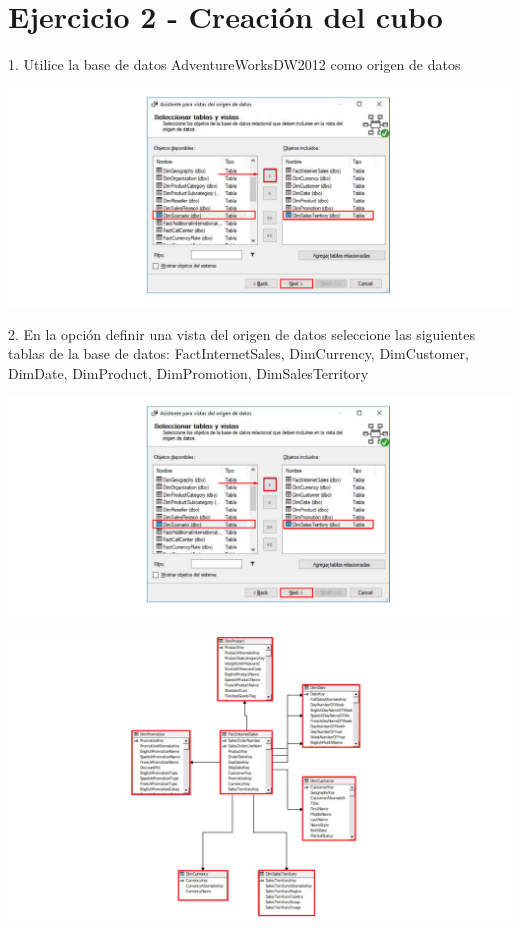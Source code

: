 \section{Ejercicio 2 - Creación del cubo}  



1. Utilice la base de datos AdventureWorksDW2012 como origen de datos

	\begin{center}
	\includegraphics[width=\columnwidth]{images/task2/img1}
	\end{center}	


2. En la opción definir una vista del origen de datos seleccione las siguientes tablas de la base de datos:
FactInternetSales, DimCurrency, DimCustomer, DimDate, DimProduct, DimPromotion, DimSalesTerritory

	\begin{center}
	\includegraphics[width=\columnwidth]{images/task2/img2}
	\end{center}	

	\begin{center}
	\includegraphics[width=\columnwidth]{images/task2/img3}
	\end{center}	

